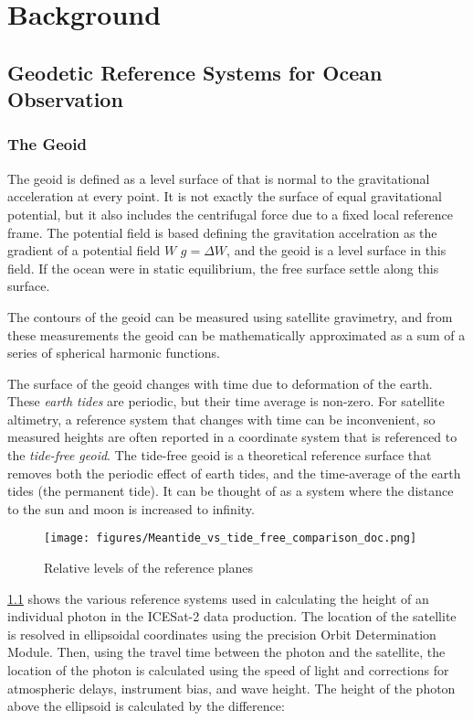 \chapter{Background}
\section{Geodetic Reference Systems for Ocean Observation}
\subsection{The Geoid}
The geoid is defined as a level surface of that is normal to the gravitational acceleration at every point. It is not exactly the surface of equal gravitational potential, but it also includes the centrifugal force due to a fixed local reference frame. The potential field is based defining the gravitation accelration as the gradient of a potential field $W$ $g=\Delta W$, and the geoid is a level surface in this field. If the ocean were in static equilibrium, the free surface settle along this surface.

The contours of the geoid can be measured using satellite gravimetry, and from these measurements the geoid can be mathematically approximated as a sum of a series of spherical harmonic functions.

The surface of the geoid changes with time due to deformation of the earth. These \emph{earth tides} are periodic, but their time average is non-zero. For satellite altimetry, a reference system that changes with time can be inconvenient, so measured heights are often reported in a coordinate system that is referenced to the \emph{tide-free geoid}. The tide-free geoid is a theoretical reference surface that removes both the periodic effect of earth tides, and the time-average of the earth tides (the permanent tide). It can be thought of as a system where the distance to the sun and moon is increased to infinity.

\begin{figure}[h!]
      \centering
      \texttt{[image: figures/Meantide\_vs\_tide\_free\_comparison\_doc.png]}
      \caption{Relative levels of the reference planes}
      \label{fig:geoids-ellipsoids-graphics}
\end{figure}

\ref{fig:geoids-ellipsoids-graphics} shows the various reference systems used in calculating the height of an individual photon in the ICESat-2 data production. The location of the satellite is resolved in ellipsoidal coordinates using the precision Orbit Determination Module. Then, using the travel time between the photon and the satellite, the location of the photon is calculated using the speed of light and corrections for atmospheric delays, instrument bias, and wave height. The height of the photon above the ellipsoid is calculated by the difference:


